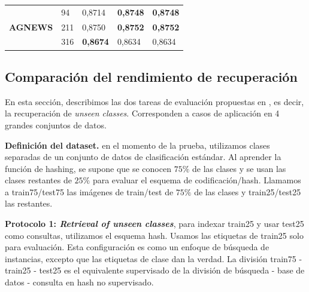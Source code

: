 \begin{table}[!h]
\begin{tabular}{|l|l|l|l|l|}
\multirow{3}{*}{\textbf{AGNEWS}}   & 94                                 & 0,8714                            & \textbf{0,8748}                        & \textbf{0,8748}                                     \\ \cline{2-5} 
                                   & 211                                & 0,8750                          & \textbf{0,8752}                          & \textbf{0,8752}                                     \\ \cline{2-5} 
                                   & 316                                & \textbf{0,8674}                            & 0,8634                        & 0,8634                                     \\ \hline
\end{tabular}
\end{table}

\subsection{Comparación del rendimiento de recuperación}
En esta sección, describimos las dos tareas de evaluación propuestas en \cite{sablayrolles2016should}, es decir, la recuperación de \textit{unseen classes}. Corresponden a casos de aplicación en 4 grandes conjuntos de datos.

\textbf{Definición del dataset.} en el momento de la prueba, utilizamos clases separadas de un conjunto de datos de clasificación estándar. Al aprender la función de hashing, se supone que se conocen $ 75\% $ de las clases y se usan las clases restantes de $ 25\% $ para evaluar el esquema de codificación/hash. Llamamos a train75/test75 las imágenes de train/test de $ 75\% $ de las clases y train25/test25 las restantes.

\textbf{Protocolo 1: \textit{Retrieval of unseen classes}}, para indexar train25 y usar test25 como consultas, utilizamos el esquema hash. Usamos las etiquetas de train25 solo para evaluación. Esta configuración es como un enfoque de búsqueda de instancias, excepto que las etiquetas de clase dan la verdad. La división train75 - train25 - test25 es el equivalente supervisado de la división de búsqueda - base de datos - consulta en hash no supervisado.

